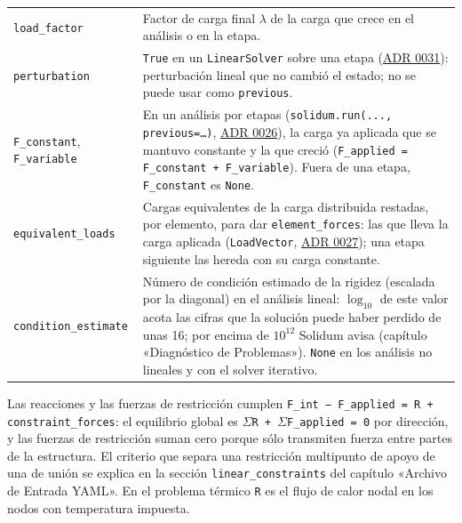 \documentclass[11pt,oneside]{report}
\begin{document}
\begin{center}
\begin{tabularx}{\textwidth}{YY}
\texttt{load\_factor} & Factor de carga final \ensuremath{\lambda} de la carga que crece en el análisis o en la etapa. \\
\texttt{perturbation} & \texttt{True} en un \texttt{LinearSolver} sobre una etapa (\href{https://github.com/jretamav/solidum-fem/blob/main/docs/adr/0031-analisis-lineales-sobre-el-estado-de-una-etapa.md}{ADR 0031}): perturbación lineal que no cambió el estado; no se puede usar como \texttt{previous}. \\
\texttt{F\_constant}, \texttt{F\_variable} & En un análisis por etapas (\texttt{solidum.\allowbreak{}run(.\allowbreak{}.\allowbreak{}.\allowbreak{}, previous=\ldots{})}, \href{https://github.com/jretamav/solidum-fem/blob/main/docs/adr/0026-etapas-de-carga-en-los-solvers-estaticos.md}{ADR 0026}), la carga ya aplicada que se mantuvo constante y la que creció (\texttt{F\_\allowbreak{}applied = F\_\allowbreak{}constant + F\_\allowbreak{}variable}). Fuera de una etapa, \texttt{F\_constant} es \texttt{None}. \\
\texttt{equivalent\_loads} & Cargas equivalentes de la carga distribuida restadas, por elemento, para dar \texttt{element\_forces}: las que lleva la carga aplicada (\texttt{LoadVector}, \href{https://github.com/jretamav/solidum-fem/blob/main/docs/adr/0027-cargas-con-sus-cargas-equivalentes.md}{ADR 0027}); una etapa siguiente las hereda con su carga constante. \\
\texttt{condition\_\allowbreak{}estimate} & Número de condición estimado de la rigidez (escalada por la diagonal) en el análisis lineal: $\log_{10}$ de este valor acota las cifras que la solución puede haber perdido de unas 16; por encima de $10^{12}$ Solidum avisa (capítulo «Diagnóstico de Problemas»). \texttt{None} en los análisis no lineales y con el solver iterativo. \\
\hline
\end{tabularx}
\end{center}
Las reacciones y las fuerzas de restricción cumplen \texttt{F\_\allowbreak{}int − F\_\allowbreak{}applied = R + constraint\_\allowbreak{}forces}: el equilibrio global es \texttt{\ensuremath{\Sigma}R + \ensuremath{\Sigma}F\_\allowbreak{}applied = 0} por dirección, y las fuerzas de restricción suman cero porque sólo transmiten fuerza entre partes de la estructura. El criterio que separa una restricción multipunto de apoyo de una de unión se explica en la sección \texttt{linear\_\allowbreak{}constraints} del capítulo «Archivo de Entrada YAML». En el problema térmico \texttt{R} es el flujo de calor nodal en los nodos con temperatura impuesta.
\end{document}
